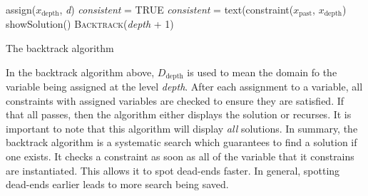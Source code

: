 \documentclass[CS4402-Notes.tex]{subfiles}
\begin{document}
\begin{algorithm}[H]
\begin{algorithmic}[1]
\State assign($x_{\text{depth}}$, \textit{d})
\State \textit{consistent} = TRUE
    \State \textit{consistent} = text(constraint($x_{\text{past}}$, $x_{\text{depth}}$)
  \EndFor
      \State showSolution()
    \Else
      \State \textsc{Backtrack}(\textit{depth} + 1)
    \EndIf
  \EndIf
\EndFor
\EndProcedure
\end{algorithmic}
\caption{The backtrack algorithm}
\end{algorithm}
In the backtrack algorithm above, $D_{\text{depth}}$ is used to mean the domain fo the variable being assigned at the level \textit{depth}. After each assignment to a variable, all constraints with assigned variables are checked to ensure they are satisfied. If that all passes, then the algorithm either displays the solution or recurses. It is important to note that this algorithm will display \textit{all} solutions.
\n
In summary, the backtrack algorithm is a systematic search which guarantees to find a solution if one exists. It checks a constraint as soon as all of the variable that it constrains are instantiated. This allows it to spot dead-ends faster. In general, spotting dead-ends earlier leads to more search being saved.
\end{document}
